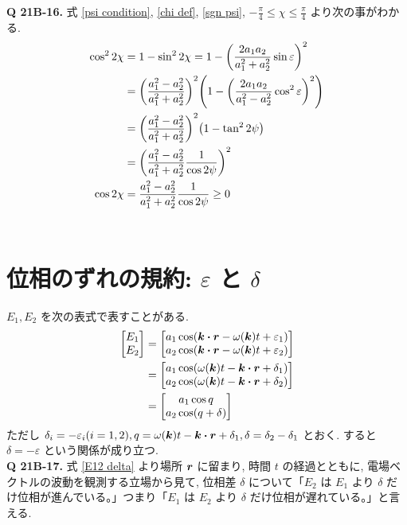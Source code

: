 \documentclass[a4paper,dvipdfmx]{jsarticle}
\theoremstyle{definition}
\begin{document}
\textbf{Q 21B-16.}
式 \eqref{psi condition}, \eqref{chi def}, \eqref{sgn psi}, $-\frac{\pi}{4} \leq \chi \leq \frac{\pi}{4}$ より次の事がわかる.
\begin{align}
  \cos^22\chi & = 1 - \sin^22\chi = 1 - \qty(\frac{2a_1a_2}{a_1^2 + a_2^2}\sin\varepsilon)^2                                  \\
              & = \qty(\frac{a_1^2 - a_2^2}{a_1^2 + a_2^2})^2\qty(1 - \qty(\frac{2a_1a_2}{a_1^2 - a_2^2}\cos^2\varepsilon)^2) \\
              & = \qty(\frac{a_1^2 - a_2^2}{a_1^2 + a_2^2})^2\qty(1 - \tan^22\psi)                                            \\
              & = \qty(\frac{a_1^2 - a_2^2}{a_1^2 + a_2^2}\frac{1}{\cos2\psi})^2                                              \\
  \cos2\chi   & = \frac{a_1^2 - a_2^2}{a_1^2 + a_2^2}\frac{1}{\cos2\psi} \geq 0 \label{cos 2chi}
\end{align} \\

\section{位相のずれの規約: $\varepsilon$ と $\delta$}
$E_1, E_2$ を次の表式で表すことがある.
\begin{align}
  \mqty[E_1                                                 \\ E_2] &= \mqty[a_1\cos(\kk\vdot\rr - \omega(\kk)t + \varepsilon_1) \\ a_2\cos(\kk\vdot\rr - \omega(\kk)t + \varepsilon_2)] \\
   & = \mqty[a_1\cos(\omega(\kk)t - \kk\vdot\rr + \delta_1) \\ a_2\cos(\omega(\kk)t - \kk\vdot\rr + \delta_2)] \\
   & = \mqty[a_1\cos q                                      \\ a_2\cos(q + \delta)] \label{E12 delta}
\end{align}
ただし $\delta_i = - \varepsilon_i (i = 1, 2), q = \omega(\kk)t - \kk\vdot\rr + \delta_1, \delta = \delta_2 - \delta_1$ とおく. すると $\delta = -\varepsilon$ という関係が成り立つ. \\

\textbf{Q 21B-17.}
式 \eqref{E12 delta} より場所 $\vb*{r}$ に留まり, 時間 $t$ の経過とともに, 電場ベクトルの波動を観測する立場から見て, 位相差 $\delta$ について「$E_2$ は $E_1$ より $\delta$ だけ位相が進んでいる。」つまり「$E_1$ は $E_2$ より $\delta$ だけ位相が遅れている。」と言える.
\end{document}
